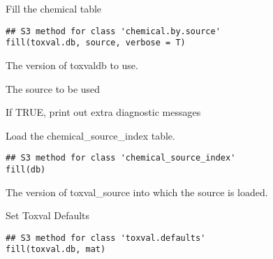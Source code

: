 \documentclass[letterpaper]{book}
\begin{document}
%
\begin{Description}\relax
Fill the chemical table
\end{Description}
%
\begin{Usage}
\begin{verbatim}
## S3 method for class 'chemical.by.source'
fill(toxval.db, source, verbose = T)
\end{verbatim}
\end{Usage}
%
\begin{Arguments}
\begin{ldescription}
\item[\code{toxval.db}] The version of toxvaldb to use.

\item[\code{source}] The source to be used

\item[\code{verbose}] If TRUE, print out extra diagnostic messages
\end{ldescription}
\end{Arguments}
%
\begin{Description}\relax
Load the chemical\_source\_index table.
\end{Description}
%
\begin{Usage}
\begin{verbatim}
## S3 method for class 'chemical_source_index'
fill(db)
\end{verbatim}
\end{Usage}
%
\begin{Arguments}
\begin{ldescription}
\item[\code{db}] The version of toxval\_source into which the source is loaded.
\end{ldescription}
\end{Arguments}
%
\begin{Description}\relax
Set Toxval Defaults
\end{Description}
%
\begin{Usage}
\begin{verbatim}
## S3 method for class 'toxval.defaults'
fill(toxval.db, mat)
\end{verbatim}
\end{Usage}
\end{document}
